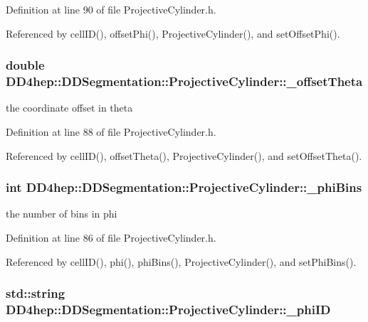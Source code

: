 Definition at line 90 of file ProjectiveCylinder.h.

Referenced by cellID(), offsetPhi(), ProjectiveCylinder(), and setOffsetPhi().\hypertarget{class_d_d4hep_1_1_d_d_segmentation_1_1_projective_cylinder_afb07d1274b199b7d48c6c915e149e5a6}{
\subsubsection[{\_\-offsetTheta}]{\setlength{\rightskip}{0pt plus 5cm}double {\bf DD4hep::DDSegmentation::ProjectiveCylinder::\_\-offsetTheta}}}
\label{class_d_d4hep_1_1_d_d_segmentation_1_1_projective_cylinder_afb07d1274b199b7d48c6c915e149e5a6}


the coordinate offset in theta 

Definition at line 88 of file ProjectiveCylinder.h.

Referenced by cellID(), offsetTheta(), ProjectiveCylinder(), and setOffsetTheta().\hypertarget{class_d_d4hep_1_1_d_d_segmentation_1_1_projective_cylinder_a80805ac35e9e3580d0d4e8dd0285ca4e}{
\subsubsection[{\_\-phiBins}]{\setlength{\rightskip}{0pt plus 5cm}int {\bf DD4hep::DDSegmentation::ProjectiveCylinder::\_\-phiBins}}}
\label{class_d_d4hep_1_1_d_d_segmentation_1_1_projective_cylinder_a80805ac35e9e3580d0d4e8dd0285ca4e}


the number of bins in phi 

Definition at line 86 of file ProjectiveCylinder.h.

Referenced by cellID(), phi(), phiBins(), ProjectiveCylinder(), and setPhiBins().\hypertarget{class_d_d4hep_1_1_d_d_segmentation_1_1_projective_cylinder_a371344e0fee63cfe8e6c58cf9132fde2}{
\subsubsection[{\_\-phiID}]{\setlength{\rightskip}{0pt plus 5cm}std::string {\bf DD4hep::DDSegmentation::ProjectiveCylinder::\_\-phiID}}}
\label{class_d_d4hep_1_1_d_d_segmentation_1_1_projective_cylinder_a371344e0fee63cfe8e6c58cf9132fde2}


